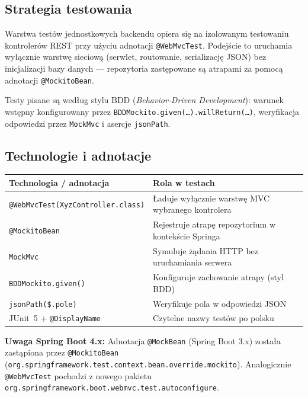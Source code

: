 \documentclass[12pt,a4paper]{article}
\begin{document}
\subsection{Strategia testowania}

Warstwa testów jednostkowych backendu opiera się na izolowanym testowaniu kontrolerów REST
przy użyciu adnotacji \texttt{@WebMvcTest}. Podejście to uruchamia wyłącznie warstwę sieciową
(serwlet, routowanie, serializację JSON) bez inicjalizacji bazy danych --- repozytoria
zastępowane są atrapami za pomocą adnotacji \texttt{@MockitoBean}.

Testy pisane są według stylu BDD (\textit{Behavior-Driven Development}): warunek wstępny
konfigurowany przez \texttt{BDDMockito.given(\ldots).willReturn(\ldots)}, weryfikacja
odpowiedzi przez \texttt{MockMvc} i asercje \texttt{jsonPath}.

\subsection{Technologie i adnotacje}

\begin{center}
\begin{tabular}{lp{7.5cm}}
  \toprule
  \textbf{Technologia / adnotacja} & \textbf{Rola w testach} \\
  \midrule
  \texttt{@WebMvcTest(XyzController.class)} & Ładuje wyłącznie warstwę MVC wybranego kontrolera \\
  \texttt{@MockitoBean}           & Rejestruje atrapę repozytorium w kontekście Springa \\
  \texttt{MockMvc}                & Symuluje żądania HTTP bez uruchamiania serwera \\
  \texttt{BDDMockito.given()}     & Konfiguruje zachowanie atrapy (styl BDD) \\
  \texttt{jsonPath(\$.pole)}      & Weryfikuje pola w odpowiedzi JSON \\
  JUnit~5 + \texttt{@DisplayName} & Czytelne nazwy testów po polsku \\
  \bottomrule
\end{tabular}
\end{center}

\textbf{Uwaga Spring Boot 4.x:} Adnotacja \texttt{@MockBean} (Spring Boot 3.x) została
zastąpiona przez \texttt{@MockitoBean}
(\texttt{org.springframework.test.context.bean.override.mockito}).
Analogicznie \texttt{@WebMvcTest} pochodzi z nowego pakietu
\texttt{org.springframework.boot.webmvc.test.autoconfigure}.
\end{document}
